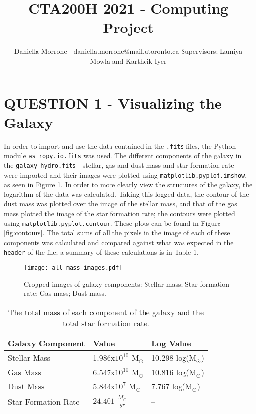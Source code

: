 \documentclass[10pt, preprint]{aastex}
\title{\Large CTA200H 2021 - Computing Project}
\author{Daniella Morrone - daniella.morrone@mail.utoronto.ca
\linebreak
Supervisors: Lamiya Mowla and Kartheik Iyer}
\begin{document}
\section*{\large\textbf{QUESTION 1 - Visualizing the Galaxy}}\label{sec:1}

In order to import and use the data contained in the \texttt{.fits} files, the Python module \texttt{astropy.io.fits} was used. The different components of the galaxy in the \texttt{galaxy\_hydro.fits} - stellar, gas and dust mass and star formation rate - were imported and their images were plotted using \texttt{matplotlib.pyplot.imshow}, as seen in Figure \ref{fig:components}. In order to more clearly view the structures of the galaxy, the logarithm of the data was calculated. Taking this logged data, the contour of the dust mass was plotted over the image of the stellar mass, and that of the gas mass plotted the image of the star formation rate; the contours were plotted using \texttt{matplotlib.pyplot.contour}. These plots can be found in Figure \ref{fig:contours}. The total sums of all the pixels in the image of each of these components was calculated and compared against what was expected in the \texttt{header} of the file; a summary of these calculations is in Table \ref{Table:totals}.

\vspace{-1.5\baselineskip}

\begin{figure}[H]
    \centering
    \texttt{[image: all\_mass\_images.pdf]}  
    \vspace{-2\baselineskip}
    \caption{Cropped images of galaxy components: Stellar mass; Star formation rate; Gas mass; Dust mass.}   
    \label{fig:components}
\end{figure}

\begin{table}[H]
    \centering
    \begin{tabular}{lll}
        \hline
         Galaxy Component & Value & Log Value \\\hline
         Stellar Mass & 1.986x$10^{10}$ M$_\odot$ & 10.298 log(M$_\odot$)\\
         Gas Mass & 6.547x$10^{10}$ M$_\odot$ & 10.816 log(M$_\odot$)\\
         Dust Mass & 5.844x$10^{7}$ M$_\odot$ & 7.767 log(M$_\odot$)\\
         Star Formation Rate & $24.401$ $\frac{M_\odot}{yr}$ &  -- \\\hline
    \end{tabular}
    \caption{The total mass of each component of the galaxy and the total star formation rate.}
    \label{Table:totals}
\end{table}
\end{document}
